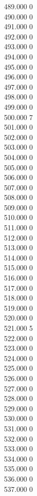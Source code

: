 { 489.000	0 \\
 490.000	0 \\
 491.000	0 \\
 492.000	0 \\
 493.000	0 \\
 494.000	0 \\
 495.000	0 \\
 496.000	0 \\
 497.000	0 \\
 498.000	0 \\
 499.000	0 \\
 500.000	7 \\
 501.000	0 \\
 502.000	0 \\
 503.000	0 \\
 504.000	0 \\
 505.000	0 \\
 506.000	0 \\
 507.000	0 \\
 508.000	0 \\
 509.000	0 \\
 510.000	0 \\
 511.000	0 \\
 512.000	0 \\
 513.000	0 \\
 514.000	0 \\
 515.000	0 \\
 516.000	0 \\
 517.000	0 \\
 518.000	0 \\
 519.000	0 \\
 520.000	0 \\
 521.000	5 \\
 522.000	0 \\
 523.000	0 \\
 524.000	0 \\
 525.000	0 \\
 526.000	0 \\
 527.000	0 \\
 528.000	0 \\
 529.000	0 \\
 530.000	0 \\
 531.000	0 \\
 532.000	0 \\
 533.000	0 \\
 534.000	0 \\
 535.000	0 \\
 536.000	0 \\
 537.000	0 \\
}
